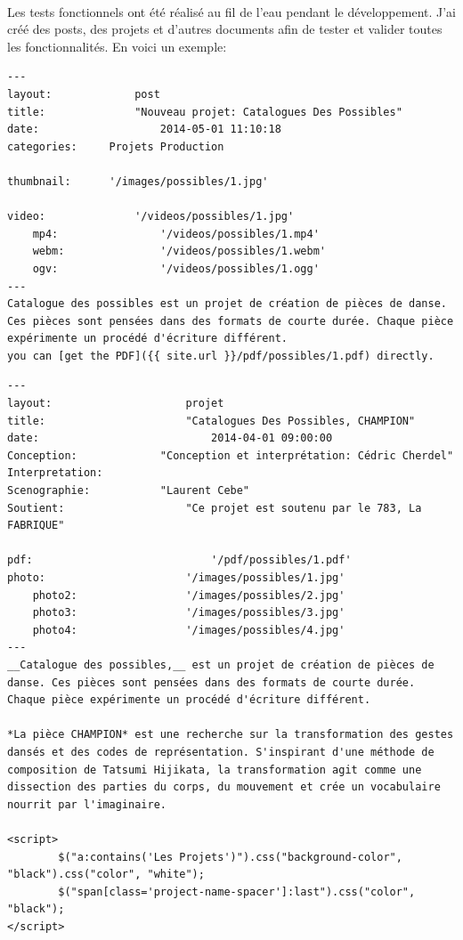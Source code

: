 \documentclass[11pt,a4paper,twoside]{report}
\begin{document}
			\paragraph*{}Les tests fonctionnels ont été réalisé au fil de l'eau pendant le développement. J'ai créé des posts, des projets et d'autres documents afin de tester et valider toutes les fonctionnalités. En voici un exemple:
			
			\lstset{caption=fichier Markdown d'un post}
			\begin{lstlisting}
---
layout:				post
title:				"Nouveau projet: Catalogues Des Possibles"
date:					2014-05-01 11:10:18
categories:		Projets Production

thumbnail:		'/images/possibles/1.jpg'

video:				'/videos/possibles/1.jpg'
	mp4:				'/videos/possibles/1.mp4'
	webm:				'/videos/possibles/1.webm'
	ogv:				'/videos/possibles/1.ogg'
---
Catalogue des possibles est un projet de création de pièces de danse. Ces pièces sont pensées dans des formats de courte durée. Chaque pièce expérimente un procédé d'écriture différent.
you can [get the PDF]({{ site.url }}/pdf/possibles/1.pdf) directly.
			\end{lstlisting}

			\lstset{caption=fichier Markdown d'un projet}
			\begin{lstlisting}
---
layout:						projet
title:						"Catalogues Des Possibles, CHAMPION"
date:							2014-04-01 09:00:00
Conception:				"Conception et interprétation: Cédric Cherdel"
Interpretation:     
Scenographie:			"Laurent Cebe"
Soutient:					"Ce projet est soutenu par le 783, La FABRIQUE"

pdf:							'/pdf/possibles/1.pdf'
photo:						'/images/possibles/1.jpg'
	photo2:					'/images/possibles/2.jpg'
	photo3:					'/images/possibles/3.jpg'
	photo4:					'/images/possibles/4.jpg'
---
__Catalogue des possibles,__ est un projet de création de pièces de danse. Ces pièces sont pensées dans des formats de courte durée. Chaque pièce expérimente un procédé d'écriture différent.

*La pièce CHAMPION* est une recherche sur la transformation des gestes dansés et des codes de représentation. S'inspirant d'une méthode de composition de Tatsumi Hijikata, la transformation agit comme une dissection des parties du corps, du mouvement et crée un vocabulaire nourrit par l'imaginaire.

<script>
		$("a:contains('Les Projets')").css("background-color", "black").css("color", "white");
		$("span[class='project-name-spacer']:last").css("color", "black");
</script>
			 \end{lstlisting}			 
\end{document}
